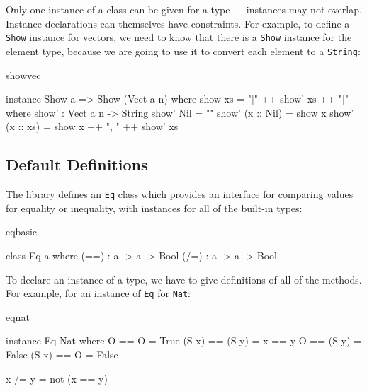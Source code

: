 \noindent
Only one instance of a class can be given for a type --- instances may not overlap.
Instance declarations can themselves have constraints. For example, to define a
\texttt{Show} instance for vectors, we need to know that there is a \texttt{Show} 
instance for the element type, because we are going to use it to convert each element
to a \texttt{String}:

\begin{SaveVerbatim}{showvec}

instance Show a => Show (Vect a n) where
    show xs = "[" ++ show' xs ++ "]" where
        show' : Vect a n -> String
        show' Nil        = ""
        show' (x :: Nil) = show x
        show' (x :: xs)  = show x ++ ", " ++ show' xs

\end{SaveVerbatim}


\subsection{Default Definitions}

The library defines an \texttt{Eq} class which provides an interface for comparing
values for equality or inequality, with instances for all of the built-in types:

\begin{SaveVerbatim}{eqbasic}

class Eq a where
    (==) : a -> a -> Bool
    (/=) : a -> a -> Bool

\end{SaveVerbatim}

\noindent
To declare an instance of a type, we have to give definitions of all of the methods.
For example, for an instance of \texttt{Eq} for \texttt{Nat}:

\begin{SaveVerbatim}{eqnat}

instance Eq Nat where
    O     == O     = True
    (S x) == (S y) = x == y
    O     == (S y) = False
    (S x) == O     = False

    x /= y = not (x == y)

\end{SaveVerbatim}

